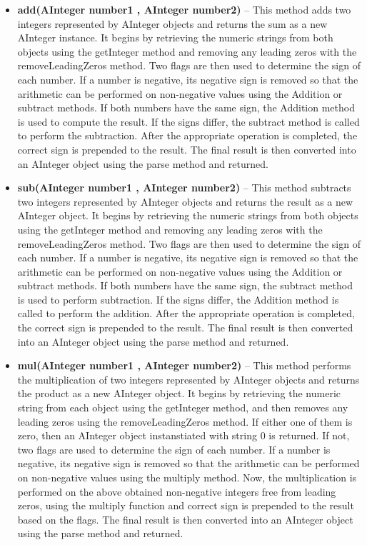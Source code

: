 \documentclass[a4paper,12pt]{article}
\begin{document}
{\begin{itemize}
    \item \textbf{add(AInteger number1 , AInteger number2)} -- This method adds two integers represented by AInteger objects and returns the sum as a new AInteger instance. It begins by retrieving the numeric strings from both objects using the getInteger method and removing any leading zeros with the removeLeadingZeros method. Two flags are then used to determine the sign of each number. If a number is negative, its negative sign is removed so that the arithmetic can be performed on non-negative values using the Addition or subtract methods. If both numbers have the same sign, the Addition method is used to compute the result. If the signs differ, the subtract method is called to perform the subtraction. After the appropriate operation is completed, the correct sign is prepended to the result. The final result is then converted into an AInteger object using the parse method and returned.\\

    \item \textbf{sub(AInteger number1 , AInteger number2)} -- This method subtracts two integers represented by AInteger objects and returns the result as a new AInteger object. It begins by retrieving the numeric strings from both objects using the getInteger method and removing any leading zeros with the removeLeadingZeros method. Two flags are then used to determine the sign of each number. If a number is negative, its negative sign is removed so that the arithmetic can be performed on non-negative values using the Addition or subtract methods. If both numbers have the same sign, the subtract method is used to perform subtraction. If the signs differ, the Addition method is called to perform the addition. After the appropriate operation is completed, the correct sign is prepended to the result. The final result is then converted into an AInteger object using the parse method and returned.\\

    \item \textbf{mul(AInteger number1 , AInteger number2)} -- This method performs the multiplication of two integers represented by AInteger objects and returns the product as a new AInteger object. It begins by retrieving the numeric string from each object using the getInteger method, and then removes any leading zeros using the removeLeadingZeros method. If either one of them is zero, then an AInteger object instanstiated with string $0$ is returned. If not, two flags are used to determine the sign of each number. If a number is negative, its negative sign is removed so that the arithmetic can be performed on non-negative values using the multiply method. Now, the multiplication is performed on the above obtained non-negative integers free from leading zeros, using the multiply function and correct sign is prepended to the result based on the flags. The final result is then converted into an AInteger object using the parse method and returned.\\


\end{itemize}}
\end{document}
